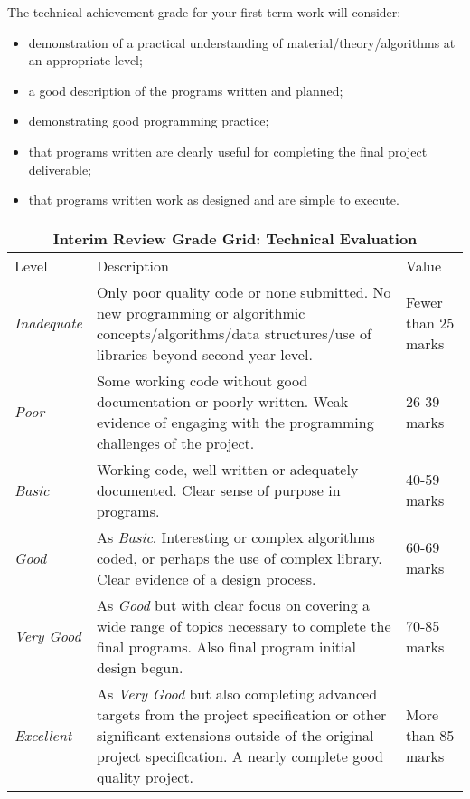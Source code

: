 \documentclass[11pt]{article}
\begin{document}
The technical achievement grade for your first term work will consider:
\begin{itemize}
\item demonstration of a practical understanding  of material/theory/algorithms at an appropriate level;
\item a good description of the programs written and planned;
\item demonstrating good programming practice;
\item that programs written are clearly useful for completing the final project deliverable;
\item that programs written work as designed and are simple to execute.
\end{itemize}
\vspace*{10mm}

\noindent
\begin{tabular}{||l|p{10cm}|l||}
\hline
\hline
\multicolumn{3}{||c||}{\textbf{Interim Review Grade Grid: Technical Evaluation}}\\
\hline
\hline
Level & Description & Value\\
\hline
\textit{Inadequate} & Only poor quality code or none submitted.  No new programming or algorithmic concepts/algorithms/data structures/use of libraries beyond second year level. & Fewer than 25 marks\\
\hline
\textit{Poor} & Some working code without good documentation or poorly written. Weak evidence of engaging with the programming challenges of the project.  & 26-39 marks \\
\hline
\textit{Basic} & Working code, well written or adequately documented.  Clear sense of purpose in programs. & 40-59 marks\\
\hline
\textit{Good} & As \textit{Basic}.  Interesting or complex algorithms coded, or perhaps the use of complex library.  Clear evidence of a design process. & 60-69 marks\\
\hline
\textit{Very Good} & As \textit{Good} but with clear focus on covering a wide range of topics necessary to complete the final programs.  Also final program initial design begun. & 70-85 marks\\
\hline
\textit{Excellent} & As \textit{Very Good} but also completing advanced targets from the project specification or other significant extensions outside of the original project specification. A nearly complete good quality project. & More than 85 marks\\
\hline\hline
\end{tabular}
\end{document}
